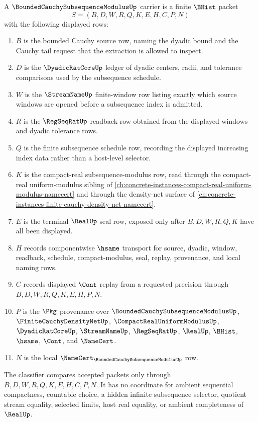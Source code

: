 \begin{definition}
\label{def:bounded-cauchy-subsequence-modulus-carrier}
A $\BoundedCauchySubsequenceModulusUp$ carrier is a finite $\BHist$ packet
$$
S=(B,D,W,R,Q,K,E,H,C,P,N)
$$
with the following displayed rows:
\begin{enumerate}
\item $B$ is the bounded Cauchy source row, naming the dyadic bound and the Cauchy tail request that the extraction is allowed to inspect.
\item $D$ is the $\DyadicRatCoreUp$ ledger of dyadic centers, radii, and tolerance comparisons used by the subsequence schedule.
\item $W$ is the $\StreamNameUp$ finite-window row listing exactly which source windows are opened before a subsequence index is admitted.
\item $R$ is the $\RegSeqRatUp$ readback row obtained from the displayed windows and dyadic tolerance rows.
\item $Q$ is the finite subsequence schedule row, recording the displayed increasing index data rather than a host-level selector.
\item $K$ is the compact-real subsequence-modulus row, read through the compact-real uniform-modulus sibling of \autoref{ch:concrete-instances-compact-real-uniform-modulus-namecert} and through the density-net surface of \autoref{ch:concrete-instances-finite-cauchy-density-net-namecert}.
\item $E$ is the terminal $\RealUp$ seal row, exposed only after $B,D,W,R,Q,K$ have all been displayed.
\item $H$ records componentwise $\hsame$ transport for source, dyadic, window, readback, schedule, compact-modulus, seal, replay, provenance, and local naming rows.
\item $C$ records displayed $\Cont$ replay from a requested precision through $B,D,W,R,Q,K,E,H,P,N$.
\item $P$ is the $\Pkg$ provenance over $\BoundedCauchySubsequenceModulusUp$, $\FiniteCauchyDensityNetUp$, $\CompactRealUniformModulusUp$, $\DyadicRatCoreUp$, $\StreamNameUp$, $\RegSeqRatUp$, $\RealUp$, $\BHist$, $\hsame$, $\Cont$, and $\NameCert$.
\item $N$ is the local $\NameCert_{\BoundedCauchySubsequenceModulusUp}$ row.
\end{enumerate}
The classifier compares accepted packets only through $B,D,W,R,Q,K,E,H,C,P,N$. It has no coordinate for ambient sequential compactness, countable choice, a hidden infinite subsequence selector, quotient stream equality, selected limits, host real equality, or ambient completeness of $\RealUp$.
\end{definition}


